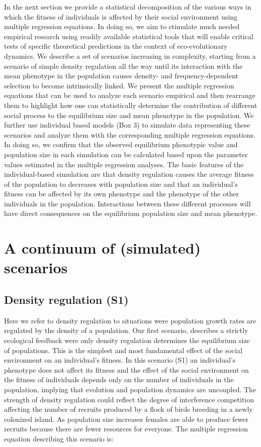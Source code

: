 \documentclass{article}
\begin{document}
In the next section we provide a statistical decomposition of the various ways in which the fitness of individuals is affected by their social environment using multiple regression equations. In doing so, we aim to stimulate much needed empirical research using readily available statistical tools that will enable critical tests of specific theoretical predictions in the context of eco-evolutionary dynamics. We describe a set of scenarios increasing in complexity, starting from a scenario of simple density regulation all the way until its interaction with the mean phenotype in the population causes density- and frequency-dependent selection to become intrinsically linked. We present the multiple regression equations that can be used to analyze each scenario empirical and then rearrange them to highlight how one can statistically determine the contribution of different social process to the equilibrium size and mean phenotype in the population. We further use individual based models (Box 3) to simulate data representing these scenarios and analyze them with the corresponding multiple regression equations. In doing so, we confirm that the observed equilibrium phenotypic value and population size in each simulation can be calculated based upon the parameter values estimated in the multiple regression analyses. The basic features of the individual-based simulation are that density regulation causes the average fitness of the population to decreases with population size and that an individual's fitness can be affected by its own phenotype and the phenotype of the other individuals in the population. Interactions between these different processes will have direct consequences on the equilibrium population size and mean phenotype. 


\section{A continuum of (simulated) scenarios}
\subsection{Density regulation (S1)}
Here we refer to density regulation to situations were population growth rates are regulated by the density of a population. Our first scenario, describes a strictly ecological feedback were only density regulation determines the equilibrium size of populations. This is the simplest and most fundamental effect of the social environment on an individual's fitness. In this scenario (S1) an individual's phenotype does not affect its fitness and the effect of the social environment on the fitness of individuals depends only on the number of individuals in the population, implying that evolution and population dynamics are uncoupled. The strength of density regulation could reflect the degree of interference competition affecting the number of recruits produced by a flock of birds breeding in a newly colonized island. As population size increases females are able to produce fewer recruits because there are fewer resources for everyone. The multiple regression equation describing this scenario is:
\end{document}
